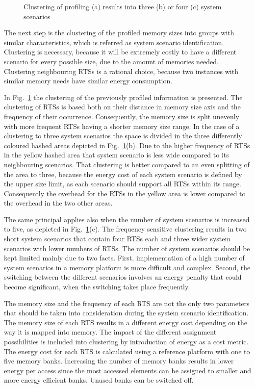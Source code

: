 \documentclass{acm_proc_article-sp}
\begin{document}
\begin{figure}[!t]
\centering
\caption{Clustering of profiling (a) results into three (b) or four (c) system scenarios}
\label{fig:clustering}
\end{figure}

The next step is the clustering of the profiled memory sizes into groups with similar characteristics, which is referred as system scenario identification. Clustering is necessary, because it will be extremely costly to have a different scenario for every possible size, due to the amount of memories needed. Clustering neighbouring RTSs is a rational choice, because two instances with similar memory needs have similar energy consumption. 

In Fig.~\ref{fig:clustering} the clustering of the previously profiled information is presented. The clustering of RTSs is based both on their distance in memory size axis and the frequency of their occurrence. Consequently, the memory size is split unevenly with more frequent RTSs having a shorter memory size range. In the case of a clustering to three system scenarios the space is divided in the three differently coloured hashed areas depicted in Fig.~\ref{fig:clustering}(b). Due to the higher frequency of RTSs in the yellow hashed area that system scenario is less wide compared to its neighbouring scenarios. That clustering is better compared to an even splitting of the area to three, because the energy cost of each system scenario is defined by the upper size limit, as each scenario should support all RTSs within its range. Consequently the overhead for the RTSs in the yellow area is lower compared to the overhead in the two other areas.

The same principal applies also when the number of system scenarios is increased to five, as depicted in Fig.~\ref{fig:clustering}(c). The frequency sensitive clustering results in two short system scenarios that contain four RTSs each and three wider system scenarios with lower numbers of RTSs. The number of system scenarios should be kept limited mainly due to two facts. First, implementation of a high number of system scenarios in a memory platform is more difficult and complex. Second, the switching between the different scenarios involves an energy penalty that could become significant, when the switching takes place frequently.

The memory size and the frequency of each RTS are not the only two parameters that should be taken into consideration during the system scenario identification. The memory size of each RTS results in a different energy cost depending on the way it is mapped into memory. The impact of the different assignment possibilities is included into clustering by introduction of energy as a cost metric. The energy cost for each RTS is calculated using a reference platform with one to five memory banks. Increasing the number of memory banks results in lower energy per access since the most accessed elements can be assigned to smaller and more energy efficient banks. Unused banks can be switched off.
\end{document}
